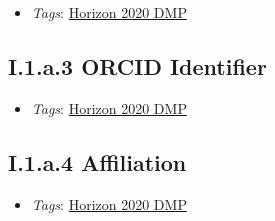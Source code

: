 \documentclass[a4paper,12pt]{report}
\begin{document}
\label{1e85da40-bbfc-4180-903e-6c569ed2da38.73d686bd-7939-412e-8631-502ee6d9ea7b.e353afd1-f1ef-42df-a9f8-4eaac8800486.3a2ffc13-6a0e-4976-bb34-14ab6d938348}


\begin{itemize}
  \item \textit{Tags}: \ul{Horizon 2020 DMP}
  \end{itemize}





\subsection*{\protect\textcolor{colorSecId}{I.1.a.3} ORCID Identifier}

\label{1e85da40-bbfc-4180-903e-6c569ed2da38.73d686bd-7939-412e-8631-502ee6d9ea7b.e353afd1-f1ef-42df-a9f8-4eaac8800486.6295a55d-48d7-4f3c-961a-45b38eeea41f}


\begin{itemize}
  \item \textit{Tags}: \ul{Horizon 2020 DMP}
  \end{itemize}





\subsection*{\protect\textcolor{colorSecId}{I.1.a.4} Affiliation}

\label{1e85da40-bbfc-4180-903e-6c569ed2da38.73d686bd-7939-412e-8631-502ee6d9ea7b.e353afd1-f1ef-42df-a9f8-4eaac8800486.68530470-1f1c-4448-8593-63a288713a66}


\begin{itemize}
  \item \textit{Tags}: \ul{Horizon 2020 DMP}
  \end{itemize}
\end{document}
